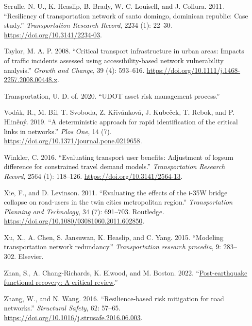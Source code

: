 \documentclass[]{ascelike-new}
\newlength{\cslhangindent}
\newlength{\cslentryspacingunit} %
\newenvironment{CSLReferences}[2] %
 {%
  \setlength{\parindent}{0pt}
  \ifodd #1
  \let\oldpar\par
  \def\par{\hangindent=\cslhangindent\oldpar}
  \fi
  \setlength{\parskip}{#2\cslentryspacingunit}
 }%
 {}
\begin{document}
\begin{CSLReferences}{1}{0}
\leavevmode{}%
Serulle, N. U., K. Heaslip, B. Brady, W. C. Louisell, and J. Collura.
2011. {``Resiliency of transportation network of santo domingo,
dominican republic: Case study.''} \emph{Transportation Research
Record}, 2234 (1): 22--30. \url{https://doi.org/10.3141/2234-03}.

\leavevmode{}%
Taylor, M. A. P. 2008. {``Critical transport infrastructure in urban
areas: Impacts of traffic incidents assessed using accessibility-based
network vulnerability analysis.''} \emph{Growth and Change}, 39 (4):
593--616. \url{https://doi.org/10.1111/j.1468-2257.2008.00448.x}.

\leavevmode{}%
Transportation, U. D. of. 2020. {``UDOT asset risk management
process.''}

\leavevmode{}%
Vodák, R., M. Bíl, T. Svoboda, Z. Křivánková, J. Kubeček, T. Rebok, and
P. Hliněný. 2019. {``A deterministic approach for rapid identification
of the critical links in networks.''} \emph{Plos One}, 14 (7).
\url{https://doi.org/10.1371/journal.pone.0219658}.

\leavevmode{}%
Winkler, C. 2016. {``Evaluating transport user benefits: Adjustment of
logsum difference for constrained travel demand models.''}
\emph{Transportation Research Record}, 2564 (1): 118--126.
\url{https://doi.org/10.3141/2564-13}.

\leavevmode{}%
Xie, F., and D. Levinson. 2011. {``Evaluating the effects of the i-35W
bridge collapse on road-users in the twin cities metropolitan region.''}
\emph{Transportation Planning and Technology}, 34 (7): 691--703.
Routledge. \url{https://doi.org/10.1080/03081060.2011.602850}.

\leavevmode{}%
Xu, X., A. Chen, S. Jansuwan, K. Heaslip, and C. Yang. 2015. {``Modeling
transportation network redundancy.''} \emph{Transportation research
procedia}, 9: 283--302. Elsevier.

\leavevmode{}%
Zhan, S., A. Chang-Richards, K. Elwood, and M. Boston. 2022.
{``\href{https://repo.nzsee.org.nz/xmlui/handle/nzsee/2507}{Post-earthquake
functional recovery: A critical review}.''}

\leavevmode{}%
Zhang, W., and N. Wang. 2016. {``Resilience-based risk mitigation for
road networks.''} \emph{Structural Safety}, 62: 57--65.
\url{https://doi.org/10.1016/j.strusafe.2016.06.003}.


\end{CSLReferences}
\end{document}
